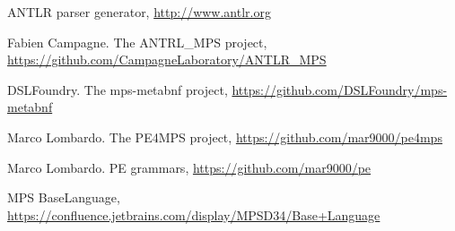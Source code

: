 \documentclass[sigconf]{acmart}
\begin{document}
\begin{thebibliography}{}
 ANTLR parser generator, \url{http://www.antlr.org}

 Fabien Campagne. The ANTRL{\_}MPS project, \url{https://github.com/CampagneLaboratory/ANTLR_MPS}

 DSLFoundry. The mps-metabnf project, \url{https://github.com/DSLFoundry/mps-metabnf}

 Marco Lombardo. The PE4MPS project, \url{https://github.com/mar9000/pe4mps}

 Marco Lombardo. PE grammars, \url{https://github.com/mar9000/pe}

 MPS BaseLanguage, \url{https://confluence.jetbrains.com/display/MPSD34/Base+Language}

\end{thebibliography}


\end{document}
